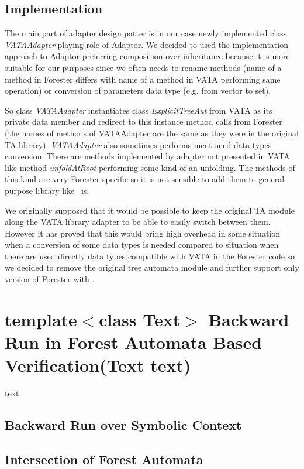\section{Implementation}
\label{sec:fova_impl}

The main part of adapter design patter is in our case newly implemented class \emph{VATAAdapter} playing role of Adaptor.
We decided to used the implementation approach to Adaptor preferring composition over inheritance
because it is more suitable for our purposes since we often needs to rename methods 
(name of a method in Forester differs with name of a method in VATA performing same operation)
or conversion of parameters data type (e.g. from vector to set). 

So class \emph{VATAAdapter} instantiates class \emph{ExplicitTreeAut} from VATA as its private data member
and redirect to this instance method calls from Forester (the names of methods of VATAAdapter are the same as they were
in the original TA library).
\emph{VATAAdapter} also sometimes performs mentioned data types conversion.
There are methods implemented by adapter not presented in VATA like method \emph{unfoldAtRoot}
performing some kind of an unfolding.
The methods of this kind are very Forester specific so it is not sensible to add them to general purpose library like \vata\ is.

We originally supposed that it would be possible to keep the original TA module along the VATA library adapter
to be able to easily switch between them.
However it has proved that this would bring high overhead in some situation when a conversion of some data types is needed
compared to situation when there are used directly data types compatible with VATA in the Forester code
so we decided to remove the original tree automata module and further support only version of Forester with \vata.

\chapter{template$<$class Text$>$ Backward Run in Forest Automata Based Verification(Text text)}
\label{ch:backward}
text

\section{Backward Run over Symbolic Context}

\section{Intersection of Forest Automata}

